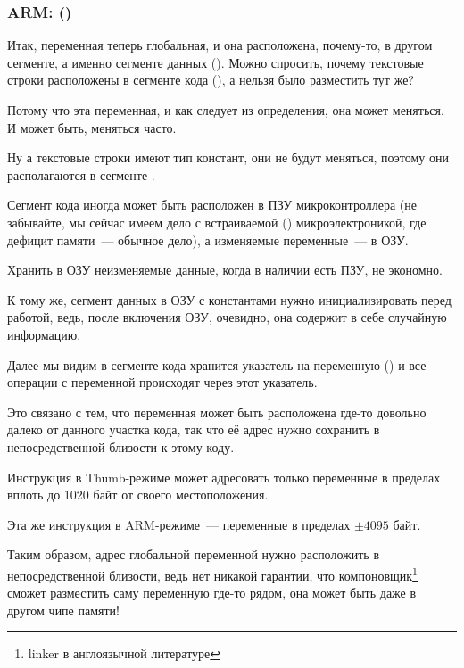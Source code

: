 \subsubsection{ARM: \OptimizingKeilVI (\ThumbMode)}



Итак, переменная  теперь глобальная, и она расположена, почему-то, в другом сегменте, а именно сегменте данных ().
Можно спросить, почему текстовые строки расположены в сегменте кода (), а  нельзя было разместить тут же?

Потому что эта переменная, и как следует из определения, она может меняться. И может быть, меняться часто.

Ну а текстовые строки имеют тип констант, они не будут меняться, поэтому они располагаются в сегменте .

\myindex{\RAM}
\myindex{\ROM}
Сегмент кода иногда может быть расположен в ПЗУ микроконтроллера (не забывайте, 
мы сейчас имеем дело с встраиваемой () микроэлектроникой,
где дефицит памяти~--- обычное дело),
а изменяемые переменные~--- в ОЗУ.

Хранить в ОЗУ неизменяемые данные, когда в наличии есть ПЗУ, не экономно.

К тому же, сегмент данных в ОЗУ с константами нужно инициализировать перед работой,
ведь, после включения ОЗУ, очевидно, она содержит в себе случайную информацию.

Далее мы видим в сегменте кода хранится указатель на переменную  () и 
все операции с переменной происходят через этот указатель.

Это связано с тем, что переменная  может быть расположена где-то довольно далеко от 
данного участка кода, так что её адрес нужно сохранить в непосредственной близости к этому коду.

Инструкция  в Thumb-режиме может адресовать только переменные в пределах вплоть до 1020 байт от своего местоположения.

Эта же инструкция в ARM-режиме~--- переменные в пределах $\pm{}4095$ байт.

Таким образом,
адрес глобальной переменной  нужно расположить в непосредственной близости, ведь нет никакой гарантии, 
что компоновщик\footnote{linker в англоязычной литературе} сможет разместить саму переменную где-то рядом, 
она может быть даже в другом чипе памяти!

